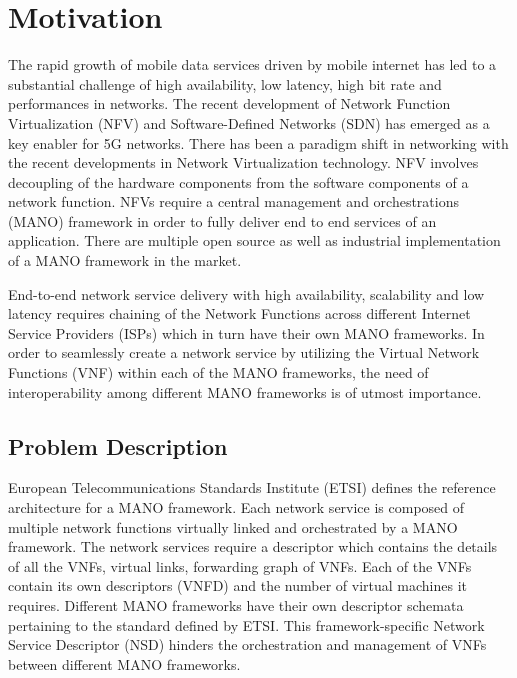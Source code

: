 \chapter{Motivation}
\label{ch:Motivation}
The rapid growth of mobile data services driven by mobile internet has led to a substantial challenge of high availability, low latency, high bit rate and performances in networks. The recent development of Network Function Virtualization (NFV) and Software-Defined Networks (SDN) has emerged as a key enabler for 5G networks. 
There has been a paradigm shift in networking with the recent developments in Network Virtualization technology. NFV involves decoupling of the hardware components from the software components of a network function. NFVs require a central management and orchestrations (MANO) framework  in order to fully deliver end to end services of an application. There are multiple open source as well as industrial implementation of a  MANO framework in the market. 

End-to-end network service delivery with high availability, scalability and low latency requires chaining of the Network Functions across different Internet Service Providers (ISPs) which in turn have their own MANO frameworks. In order to seamlessly create a network service by utilizing the Virtual Network Functions (VNF) within each of the MANO frameworks, the need of interoperability among different MANO frameworks is of utmost importance.


\section{Problem Description}

European Telecommunications Standards Institute (ETSI) defines the reference architecture for a MANO framework. Each network service is composed of multiple network functions virtually linked and orchestrated by a MANO framework. The network services require a descriptor which contains the details of all the VNFs, virtual links, forwarding graph of VNFs. Each of the VNFs contain its own descriptors (VNFD) and the number of virtual machines it requires. Different MANO frameworks have their own descriptor schemata pertaining to the standard defined by ETSI. This framework-specific Network Service Descriptor (NSD) hinders the orchestration and management of VNFs between different MANO frameworks. 

